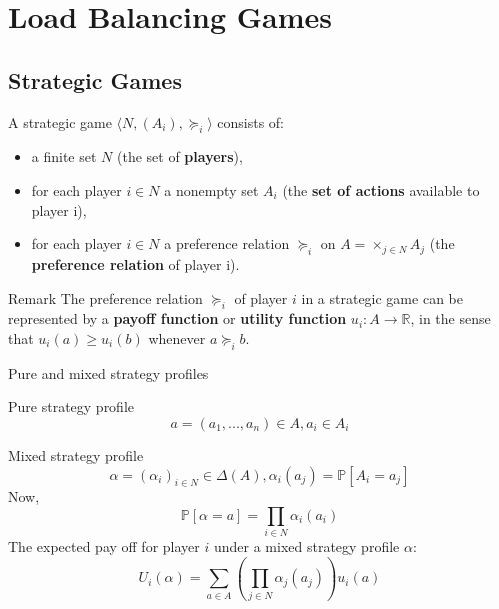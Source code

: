 \documentclass{beamer}
\renewcommand{\P}{\mathbb{P}}
\newcommand{\R}{\mathbb{R}}
\begin{document}
\section{Load Balancing Games}
\subsection{Strategic Games}
\begin{frame}
\begin{definition}
A strategic game $\langle N, (A_i), \succeq_i\rangle$ consists of:
\begin{itemize}
  \item a finite set $N$  (the set of \textbf{players}),
  \item for each player $i \in N$ a nonempty set $A_i$ (the \textbf{set of actions} available to player i),
  \item for each player $i \in N$ a preference relation $\succeq_i$ on $A=\times_{j\in N}A_j$ (the \textbf{preference relation} of player i).
\end{itemize}
\end{definition}
\begin{alertblock}{Remark}
The preference relation  $\succeq_i$ of player $i$ in a strategic game can be represented by a \textbf{payoff function} or \textbf{utility function} $u_i: A \rightarrow \R$, in the sense that $u_i(a) \geq u_i(b)$ whenever $a \succeq_i b$.
\end{alertblock}
\end{frame}


\begin{frame}{Pure and mixed strategy profiles}
\begin{block}{Pure strategy profile}
$$a = (a_1,...,a_n) \in A, a_i \in A_i$$
\end{block}

\begin{block}{Mixed strategy profile}
$$\alpha = \left(\alpha_i\right)_{i\in N} \in \Delta(A), \alpha_i(a_j) = \P[A_i = a_j]$$
Now,
$$\P[\alpha = a] = \displaystyle\prod_{i \in N} \alpha_i(a_i)$$
The expected pay off for player $i$ under a mixed strategy profile $\alpha$:
$$U_i(\alpha) = \displaystyle\sum_{a \in A}{\left(\prod_{j \in N}{\alpha_j(a_j)}\right) u_i(a)}$$
\end{block}

\end{frame}
\end{document}
